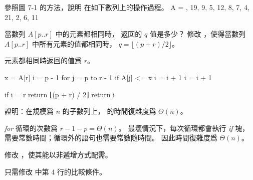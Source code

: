 \startsection[
  reference=section:desc_quicksort,
  title={Description of quicksort},
]

\startEXERCISE
參照圖 7-1 的方法，說明  在如下數列上的操作過程。
\startformula
A = , 19, 9, 5, 12, 8, 7, 4, 21, 2, 6, 11 \rangle
\stopformula
\stopEXERCISE

\startANSWER
{\externalfigure[output/e7_1_1-1]}
{\externalfigure[output/e7_1_1-2]}
{\externalfigure[output/e7_1_1-3]}
{\externalfigure[output/e7_1_1-4]}
{\externalfigure[output/e7_1_1-5]}
{\externalfigure[output/e7_1_1-6]}
{\externalfigure[output/e7_1_1-7]}
{\externalfigure[output/e7_1_1-8]}
{\externalfigure[output/e7_1_1-9]}
{\externalfigure[output/e7_1_1-10]}
{\externalfigure[output/e7_1_1-11]}
{\externalfigure[output/e7_1_1-12]}
{\externalfigure[output/e7_1_1-13]}
\stopANSWER

當數列 $A[p..r]$ 中的元素都相同時，  返回的 $q$ 值是多少？
修改 ，使得當數列 $A[p..r]$ 中所有元素的值都相同時，
 $q=\lfloor (p+r)/2\rfloor$。
\stopEXERCISE

\startANSWER
元素都相同時返回的值爲 $r$。

\startCLRSCODE
x = A[r]
i = p - 1
for j = p to r - 1
	if A[j] <= x
		i = i + 1
i = i + 1

if i = r
	return ⌊(p + r) / 2⌋
return i
\stopCLRSCODE
\stopANSWER

\startEXERCISE
證明：在規模爲 $n$ 的子數列上，  的時間復雜度爲 $\Theta(n)$。
\stopEXERCISE

\startANSWER
\emph{for} 循環的次數爲 $r - 1 - p = \Theta(n)$。
最壞情況下，每次循環都會執行 \emph{if} 塊，
需要常數時間；循環外的語句也需要常數隨時間。
因此時間復雜度爲 $\Theta(n)$。
\stopANSWER

\startEXERCISE
修改 ，使其能以非遞增方式配需。
\stopEXERCISE

\startANSWER
只需修改  中第 4 行的比較條件。
\stopANSWER

\stopsection
